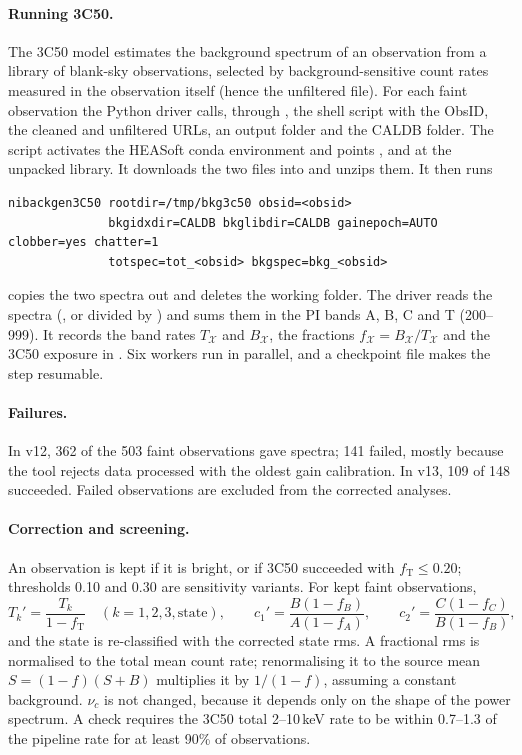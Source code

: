\paragraph{Running 3C50.} The 3C50 model \citep{Remillard2022} estimates the background spectrum of an observation from a
library of blank-sky observations, selected by background-sensitive count rates measured in the observation itself (hence
the unfiltered  file). For each faint observation the Python driver calls, through , the shell
script  with the ObsID, the cleaned and unfiltered URLs, an output folder and the CALDB folder. The
script activates the HEASoft conda environment and points ,  and  at the
unpacked library. It downloads the two files into  and unzips them. It then runs
\begin{verbatim}
nibackgen3C50 rootdir=/tmp/bkg3c50 obsid=<obsid>
              bkgidxdir=CALDB bkglibdir=CALDB gainepoch=AUTO clobber=yes chatter=1
              totspec=tot_<obsid> bkgspec=bkg_<obsid>
\end{verbatim}
copies the two spectra out and deletes the working folder. The driver reads the spectra (, or 
divided by ) and sums them in the PI bands A, B, C and T (200--999). It records the band rates $T_\mathcal X$
and $B_\mathcal X$, the fractions $f_\mathcal X=B_\mathcal X/T_\mathcal X$ and the 3C50 exposure in
. Six workers run in parallel, and a checkpoint file makes the step resumable.

\paragraph{Failures.} In v12, 362 of the 503 faint observations gave spectra; 141 failed, mostly because the tool rejects
data processed with the oldest gain calibration. In v13, 109 of 148 succeeded. Failed observations are excluded from the
corrected analyses.

\paragraph{Correction and screening.} An observation is kept if it is bright, or if 3C50 succeeded with
$f_\mathrm{T}\le0.20$; thresholds 0.10 and 0.30 are sensitivity variants. For kept faint observations,
\begin{equation}
T_k'=\frac{T_k}{1-f_\mathrm{T}}\quad(k=1,2,3,\text{state}),\qquad c_1'=\frac{B(1-f_B)}{A(1-f_A)},\qquad c_2'=\frac{C(1-f_C)}{B(1-f_B)},\label{eq:3c50}
\end{equation}
and the state is re-classified with the corrected state rms. A fractional rms is normalised to the total mean count rate;
renormalising it to the source mean $S=(1-f)(S+B)$ multiplies it by $1/(1-f)$, assuming a constant background. $\nu_c$ is
not changed, because it depends only on the shape of the power spectrum. A check requires the 3C50 total 2--10\,keV rate to
be within 0.7--1.3 of the pipeline rate for at least 90\% of observations.


